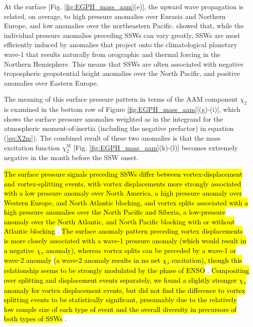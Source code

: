 \documentclass[draft,jgrga]{agutex}
\begin{document}
\begin{article}
 {At the surface} [Fig. \ref{fig:EGPH_mass_aam}(e)],   {the upward wave propagation is related, on average, to high pressure anomalies over Eurasia and Northern Europe, and low anomalies over the northeastern Pacific.}
\cite{Garfinkel2010}  {showed that, while the individual pressure anomalies preceding SSWs can vary greatly, SSWs are most efficiently induced by anomalies that project onto the climatological planetary wave-1 that results naturally from orographic and thermal forcing in the Northern Hemisphere.}
 {This means that SSWs are often associated with negative tropospheric geopotential height anomalies over the North Pacific, and positive anomalies over Eastern Europe.}

 {The meaning of this surface pressure pattern in terms of the AAM component $\chi_2$ is examined in the bottom row of Figure} \ref{fig:EGPH_mass_aam}[(g)-(i)],  {which shows the surface pressure anomalies weighted as in the integrand for the atmospheric moment-of-inertia (including the negative prefactor)} in equation (\ref{eq:X2m}).  
 {The combined result of these two anomalies is that} the  {mass} excitation function $\chi_2^{\text{M}}$ [Fig. \ref{fig:EGPH_mass_aam}(k)-(l)] becomes extremely negative in the month before the SSW onset.

\hl{The surface pressure signals preceding SSWs differ between vortex-displacement and vortex-splitting events, with vortex displacements more strongly associated with a low pressure anomaly over North America, a high pressure anomaly over Western Europe, and North Atlantic blocking, and vortex splits associated with a high pressure anomalies over the North Pacific and Siberia,  a low-pressure anomaly over the North Atlantic, and North Pacific blocking with or without Atlantic blocking} \citep{martiusetal2009,Mitchell2012}.
\hl{The surface anomaly pattern preceding vortex displacements is more closely associated with a wave-1 pressure anomaly (which would result in a negative $\chi_2$ anomaly), whereas vortex splits can be preceded by a wave-1 or wave-2 anomaly} \citep{bancalaetal2012,martiusetal2009} \hl{(a wave-2 anomaly results in no net $\chi_2$ excitation), though this relationship seems to be strongly modulated by the phase of ENSO} \citep{Barriopedro2014}.  
\hl{Compositing over splitting and displacement events separately, we found a slightly stronger $\chi_2$ anomaly for vortex displacement events, but did not find the difference to vortex splitting events to be statistically significant, presumably due to the relatively low sample size of each type of event and  the overall diversity in precursors of both types of SSWs}  \citep{Barriopedro2014}.
  

\end{article}
\end{document}
